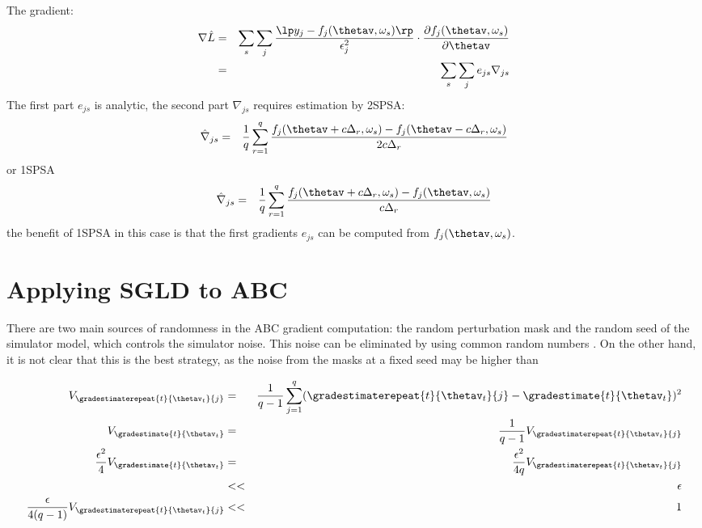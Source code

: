 The gradient:
\begin{eqnarray} 
  \nabla \hat{L} & = & \sum_s \sum_j \frac{\lp y_j - f_j(\thetav, \omega_s)\rp}{\epsilon_j^2} \cdot \frac{\partial f_j(\thetav, \omega_s)}{\partial \thetav} \\
                 & = & \sum_s \sum_j e_{js} \nabla_{js}
\end{eqnarray}
The first part $e_{js}$ is analytic, the second part $\nabla_{js}$ requires estimation by 2SPSA:
\begin{eqnarray} 
  \hat{ \nabla }_{js}  & = & \frac{1}{q} \sum_{r=1}^q \frac{f_j(\thetav + c \Delta_r , \omega_s) - f_j(\thetav - c \Delta_r , \omega_s)}{2 c \Delta_r}
\end{eqnarray}
or 1SPSA
\begin{eqnarray} 
  \hat{ \nabla }_{js} & = & \frac{1}{q} \sum_{r=1}^q \frac{f_j(\thetav + c \Delta_r , \omega_s) - f_j(\thetav, \omega_s)}{c \Delta_r}
\end{eqnarray}
the benefit of 1SPSA in this case is that the first gradients  $e_{js}$ can be computed from $f_j(\thetav, \omega_s)$.



\section{Applying SGLD to ABC}

There are two main sources of randomness in the ABC gradient computation: the random perturbation mask and the random seed of the simulator model, which controls the simulator noise.  This noise can be eliminated by using common random numbers \cite{spall-crn}.  On the other hand, it is not clear that this is the best strategy, as the noise from the masks at a fixed seed may be higher than   

\begin{eqnarray}
  V_{\gradestimaterepeat{t}{\thetav_t}{j}} & = & \frac{1}{q-1} \sum_{j=1}^q (\gradestimaterepeat{t}{\thetav_t}{j} - \gradestimate{t}{\thetav_t})^2 \\
  V_{\gradestimate{t}{\thetav_t}} & = & \frac{1}{q-1} V_{\gradestimaterepeat{t}{\thetav_t}{j}} \\
  \frac{\epsilon^2}{4 }V_{\gradestimate{t}{\thetav_t}} & = & \frac{\epsilon^2}{4 q }V_{\gradestimaterepeat{t}{\thetav_t}{j}} \\
                                                       & << & \epsilon \\
                    \frac{\epsilon}{4 (q-1) }V_{\gradestimaterepeat{t}{\thetav_t}{j}}  & << & 1                                  
\end{eqnarray}

